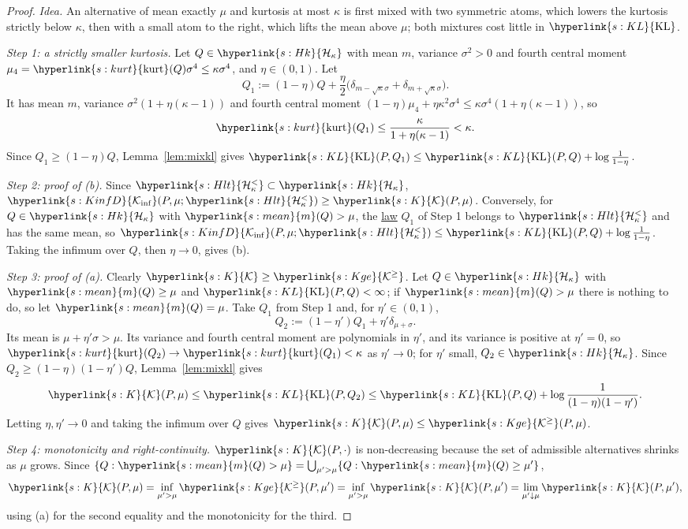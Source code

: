 \documentclass[11pt]{article}
\newcommand{\sy}[2]{{\hyperlink{#1}{#2}}}
\newcommand{\term}[2]{\hyperlink{#1}{#2}}
\newcommand{\mean}{\sy{s:mean}{m}}
\newcommand{\kurt}{\sy{s:kurt}{\mathrm{kurt}}}
\newcommand{\KL}{\sy{s:KL}{\mathrm{KL}}}
\newcommand{\Kinf}{\sy{s:KinfD}{\mathcal{K}_{\inf}}}
\newcommand{\Hk}{\sy{s:Hk}{\mathcal{H}_{\kappa}}}
\newcommand{\Hlt}{\sy{s:Hlt}{\mathcal{H}^{<}_{\kappa}}}
\newcommand{\Kc}{\sy{s:K}{\mathcal{K}}}
\newcommand{\Kge}{\sy{s:Kge}{\mathcal{K}^{\ge}}}
\begin{document}
\begin{proof}
\emph{Idea.} An alternative of mean exactly $\mu$ and kurtosis at most $\kappa$ is first mixed with two symmetric
atoms, which lowers the kurtosis strictly below $\kappa$, then with a small atom to the right, which lifts the
mean above $\mu$; both mixtures cost little in $\KL$.

\emph{Step 1: a strictly smaller kurtosis.} Let $Q\in\Hk$ with mean $m$, variance $\sigma^2>0$ and fourth central
moment $\mu_4=\kurt(Q)\sigma^4\le\kappa\sigma^4$, and $\eta\in(0,1)$. Let
\begin{equation*}
  Q_1:=(1-\eta)Q+\frac\eta2\bigl(\delta_{m-\sqrt\kappa\sigma}+\delta_{m+\sqrt\kappa\sigma}\bigr).
\end{equation*}
It has mean $m$, variance $\sigma^2(1+\eta(\kappa-1))$ and fourth central moment
$(1-\eta)\mu_4+\eta\kappa^2\sigma^4\le\kappa\sigma^4(1+\eta(\kappa-1))$, so
\begin{equation*}
  \kurt(Q_1)\le\frac{\kappa}{1+\eta(\kappa-1)}<\kappa .
\end{equation*}
Since $Q_1\ge(1-\eta)Q$, Lemma~\ref{lem:mixkl} gives $\KL(P,Q_1)\le\KL(P,Q)+\log\frac1{1-\eta}$.

\emph{Step 2: proof of (b).} Since $\Hlt\subset\Hk$, $\Kinf(P,\mu;\Hlt)\ge\Kc(P,\mu)$. Conversely, for $Q\in\Hk$ with
$\mean(Q)>\mu$, the \term{w:law}{law} $Q_1$ of Step 1 belongs to $\Hlt$ and has the same mean, so
$\Kinf(P,\mu;\Hlt)\le\KL(P,Q)+\log\frac1{1-\eta}$. Taking the infimum over $Q$, then $\eta\to0$, gives (b).

\emph{Step 3: proof of (a).} Clearly $\Kc\ge\Kge$. Let $Q\in\Hk$ with $\mean(Q)\ge\mu$ and $\KL(P,Q)<\infty$; if
$\mean(Q)>\mu$ there is nothing to do, so let $\mean(Q)=\mu$. Take $Q_1$ from Step 1 and, for $\eta'\in(0,1)$,
\begin{equation*}
  Q_2:=(1-\eta')Q_1+\eta'\delta_{\mu+\sigma}.
\end{equation*}
Its mean is $\mu+\eta'\sigma>\mu$. Its variance and fourth central moment are polynomials in $\eta'$, and its
variance is positive at $\eta'=0$, so $\kurt(Q_2)\to\kurt(Q_1)<\kappa$ as $\eta'\to0$; for $\eta'$ small,
$Q_2\in\Hk$. Since $Q_2\ge(1-\eta)(1-\eta')Q$, Lemma~\ref{lem:mixkl} gives
\begin{equation*}
  \Kc(P,\mu)\le\KL(P,Q_2)\le\KL(P,Q)+\log\frac1{(1-\eta)(1-\eta')}.
\end{equation*}
Letting $\eta,\eta'\to0$ and taking the infimum over $Q$ gives $\Kc(P,\mu)\le\Kge(P,\mu)$.

\emph{Step 4: monotonicity and right-continuity.} $\Kc(P,\cdot)$ is non-decreasing because the set of admissible
alternatives shrinks as $\mu$ grows. Since $\{Q:\mean(Q)>\mu\}=\bigcup_{\mu'>\mu}\{Q:\mean(Q)\ge\mu'\}$,
\begin{equation*}
  \Kc(P,\mu)=\inf_{\mu'>\mu}\Kge(P,\mu')=\inf_{\mu'>\mu}\Kc(P,\mu')=\lim_{\mu'\downarrow\mu}\Kc(P,\mu'),
\end{equation*}
using (a) for the second equality and the monotonicity for the third.
\end{proof}
\end{document}
